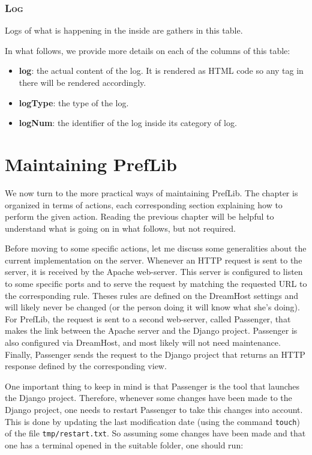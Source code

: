 \documentclass{report}
\begin{document}
	\subsection*{\faDatabase{} \textsc{Log}}
	
	Logs of what is happening in the inside are gathers in this table.
	
	In what follows, we provide more details on each of the columns of this table:
	\begin{itemize}
		\item \textbf{log}: the actual content of the log. It is rendered as HTML code so any tag in there will be rendered accordingly.
		\item \textbf{logType}: the type of the log.
		\item \textbf{logNum}: the identifier of the log inside its category of log.
	\end{itemize}


	\chapter{Maintaining PrefLib}
	
	We now turn to the more practical ways of maintaining PrefLib. The chapter is organized in terms of actions, each corresponding section explaining how to perform the given action. Reading the previous chapter will be helpful to understand what is going on in what follows, but not required.
	
	Before moving to some specific actions, let me discuss some generalities about the current implementation on the server. Whenever an HTTP request is sent to the server, it is received by the Apache web-server. This server is configured to listen to some specific ports and to serve the request by matching the requested URL to the corresponding rule. Theses rules are defined on the DreamHost settings and will likely never be changed (or the person doing it will know what she's doing). For PrefLib, the request is sent to a second web-server, called Passenger, that makes the link between the Apache server and the Django project. Passenger is also configured via DreamHost, and most likely will not need maintenance. Finally, Passenger sends the request to the Django project that returns an HTTP response defined by the corresponding view. 
	
	One important thing to keep in mind is that Passenger is the tool that launches the Django project. Therefore, whenever some changes have been made to the Django project, one needs to restart Passenger to take this changes into account. This is done by updating the last modification date (using the command \texttt{touch}) of the file \texttt{tmp/restart.txt}. So assuming some changes have been made and that one has a terminal opened in the suitable folder, one should run:
	
\end{document}
